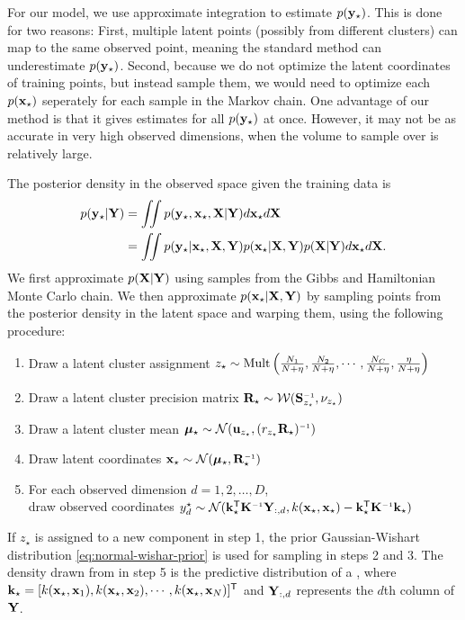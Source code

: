 For our model, we use approximate integration to estimate $p({\bf{y}}_\star)$.
This is done for two reasons:
First, multiple latent points (possibly from different clusters) can map to the same observed point, meaning the standard method can underestimate $p({\bf{y}}_\star)$.
Second, because we do not optimize the latent coordinates of training points, but instead sample them, we would need to optimize each $p({\bf{x}}_\star)$ seperately for each sample in the Markov chain.
One advantage of our method is that it gives estimates for all $p({\bf{y}}_\star)$ at once.
However, it may not be as accurate in very high observed dimensions, when the volume to sample over is relatively large.

The posterior density in the observed space given the training data is
%
\begin{align}
p({\bf{y}}_\star | \mathbf{Y})
& = \int \!\!\! \int p({\bf{y}}_\star,{\bf{x}}_\star, \mathbf{X} | \mathbf{Y})d{\bf{x}}_\star d\mathbf{X} \nonumber\\
& = \int\!\!\! \int p({\bf{y}}_\star | {\bf{x}}_\star, \mathbf{X}, \mathbf{Y})p({\bf{x}}_\star|\mathbf{X},\mathbf{Y})p(\mathbf{X}|\mathbf{Y})d{\bf{x}}_\star d\mathbf{X}.
\label{eq:density}
\end{align}
%
We first approximate $p(\mathbf{X} | \mathbf{Y})$ using samples from the Gibbs and Hamiltonian Monte Carlo chain.
We then approximate $p({\bf{x}}_\star | \mathbf{X}, \mathbf{Y})$ by sampling points from the posterior density in the latent space and warping them, using the following procedure:
%
\begin{enumerate}
\item Draw a latent cluster assignment $z_\star \sim {\rm Mult} \left( \frac{N_{1}}{N+\eta}, \frac{N_{2}}{N+\eta}, \cdots,\frac{N_{C}}{N+\eta},\frac{\eta}{N+\eta} \right)$
\item Draw a latent cluster precision matrix $\vR_\star \sim {\cal W}(\vS\inv_{z_\star},\nu_{z_\star})$
\item Draw a latent cluster mean $\vmu_\star \sim {\cal N}(\vu_{z_\star},(r_{z_\star}\vR_\star)\inv)$
\item Draw latent coordinates $\vx_\star \sim {\cal N}(\vmu_\star,\vR_\star\inv)$
\item For each observed dimension $d = 1, 2, \ldots, D$, \\ draw observed coordinates 
$y^\star_d \sim {\cal N}(\vk_\star\tra \vK\inv \vY_{:,d}, k(\vx_\star,\vx_\star) - \vk_\star\tra \vK\inv \vk_\star)$
\end{enumerate}
%
If $z_\star$ is assigned to a new component in step 1, the prior Gaussian-Wishart distribution \eqref{eq:normal-wishar-prior} is used for sampling in steps 2 and 3.
The density drawn from in step 5 is the predictive distribution of a \gp{}, where
%
${\bf{k}}_\star=[ k({\bf{x}}_\star, {\bf{x}}_1), k({\bf{x}}_\star, {\bf{x}}_2), \cdots, k({\bf{x}}_\star, {\bf{x}}_N)]^{\mathsf{T}}$ and $\mathbf{Y}_{:,d}$ represents the $d$th column of $\mathbf{Y}$.

